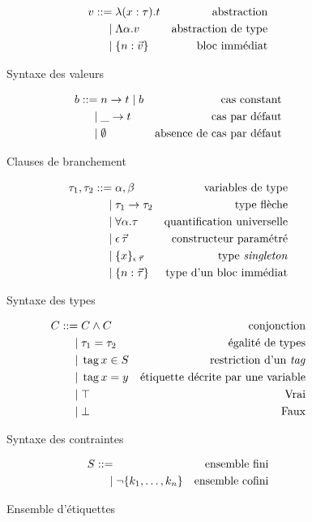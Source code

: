 \begin{figure}
\begin{align*}
  v ::=& \;     \lambda (x : \tau) . t
    & \text{abstraction}
  \\ |& \;      \Lambda \alpha . v
    & \text{abstraction de type}
  \\ |& \;      \{ n: \vec{v} \}
    & \text{bloc immédiat}
\end{align*}
\caption{Syntaxe des valeurs}
\end{figure}

\begin{figure}
\begin{align*}
  b ::=& \; n \rightarrow t \; | \; b
    & \text{cas constant}
  \\ |& \;  \_ \rightarrow t
    & \text{cas par défaut}
  \\ |& \;  \emptyset
    & \text{absence de cas par défaut}
\end{align*}
\caption{Clauses de branchement}
\end{figure}

\begin{figure}
\begin{align*}
  \tau_1, \tau_2 ::=& \; \alpha, \beta
    & \text{variables de type}
  \\ |& \;  \tau_1 \rightarrow \tau_2
    & \text{type flèche}
  \\ |& \;  \forall \alpha. \tau
    & \text{quantification universelle}
  \\ |& \;  \epsilon \, \vec{\tau}
    & \text{constructeur paramétré}
    \\ |& \;  \{ x \}_{\epsilon \, \vec{\tau}}
    & \text{type \emph{singleton}}
  \\ |& \;  \{ n: \vec{\tau} \}
    & \text{type d'un bloc immédiat}
\end{align*}
\caption{Syntaxe des types}
\end{figure}

\begin{figure}
\begin{align*}
  C ::=& \; C \wedge C
    & \text{conjonction}
  \\ |& \;  \tau_1 = \tau_2
    & \text{égalité de types}
  \\ |& \;  \operatorname{tag} x \in S
    & \text{restriction d'un \emph{tag}}
  \\ |& \;  \operatorname{tag} x = y
    & \text{étiquette décrite par une variable}
  \\ |& \;  \top
    & \text{Vrai}
  \\ |& \;  \bot
    & \text{Faux}
\end{align*}
\caption{Syntaxe des contraintes}
\end{figure}

\begin{figure}
\begin{align*}
  S ::=& \;
    & \text{ensemble fini}
  \\ |& \;  \lnot \{ k_1, \ldots, k_n \}
    & \text{ensemble cofini}
\end{align*}
\caption{Ensemble d'étiquettes}
\end{figure}


